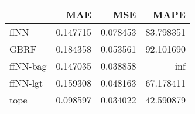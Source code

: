 \begin{tabular}{lrrr}
\toprule
{} &       MAE &       MSE &       MAPE \\
\midrule
ffNN     &  0.147715 &  0.078453 &  83.798351 \\
GBRF     &  0.184358 &  0.053561 &  92.101690 \\
ffNN-bag &  0.147035 &  0.038858 &        inf \\
ffNN-lgt &  0.159308 &  0.048163 &  67.178411 \\
tope     &  0.098597 &  0.034022 &  42.590879 \\
\bottomrule
\end{tabular}
